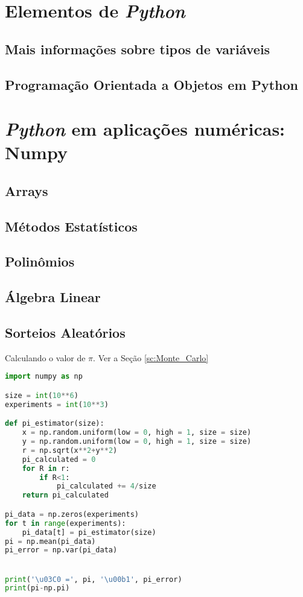 \documentclass[12pt,a4paper,titlepage,portuges,twoside,final]{book}
\begin{document}






\appendix
\chapter{Elementos de {\it Python}}\label{a:numpy}
\section{Mais informações sobre tipos de variáveis}\label{ap:1.1}
\section{Programação Orientada a Objetos em Python}\label{ap:1.2}

\chapter{{\it Python} em aplicações numéricas: Numpy}
\section{Arrays}
\section{Métodos Estatísticos}
\section{Polinômios}
\section{Álgebra Linear}
\section{Sorteios Aleatórios}

Calculando o valor de $\pi$. Ver a Seção \ref{sc:Monte_Carlo}
\begin{lstlisting}[language=Python, frame=lines,basicstyle=\footnotesize, caption={Estimando o valor de $\pi$ usando sorteios aleatórios}, label={lst:x+y}]
import numpy as np

size = int(10**6)
experiments = int(10**3)

def pi_estimator(size):
    x = np.random.uniform(low = 0, high = 1, size = size)
    y = np.random.uniform(low = 0, high = 1, size = size)
    r = np.sqrt(x**2+y**2)
    pi_calculated = 0
    for R in r:
        if R<1:
            pi_calculated += 4/size
    return pi_calculated

pi_data = np.zeros(experiments)
for t in range(experiments):
    pi_data[t] = pi_estimator(size)
pi = np.mean(pi_data)
pi_error = np.var(pi_data)


print('\u03C0 =', pi, '\u00b1', pi_error)
print(pi-np.pi)
\end{lstlisting}
\end{document}
